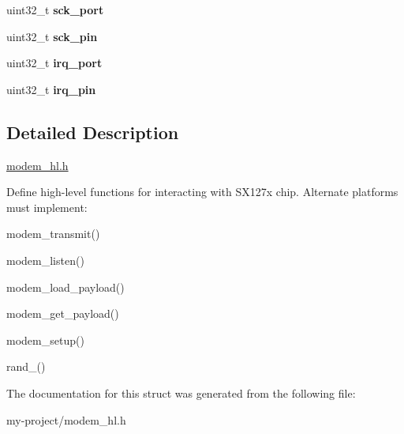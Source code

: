 \begin{DoxyCompactItemize}
\item 
\mbox{\label{structmodem__hw_af51228af0471ebc52ada791eefaf8a4e}} 
uint32\+\_\+t {\bfseries sck\+\_\+port}
\item 
\mbox{\label{structmodem__hw_a6eaf93249fa53f578bfc24f7c8cd7f26}} 
uint32\+\_\+t {\bfseries sck\+\_\+pin}
\item 
\mbox{\label{structmodem__hw_aed7efb541ab594cfdc974e2b73d76ad7}} 
uint32\+\_\+t {\bfseries irq\+\_\+port}
\item 
\mbox{\label{structmodem__hw_a55583ff559e579c242e0d1433fd9c7fa}} 
uint32\+\_\+t {\bfseries irq\+\_\+pin}
\end{DoxyCompactItemize}


\subsection{Detailed Description}
\mbox{\hyperlink{modem__hl_8h_source}{modem\+\_\+hl.\+h}}

Define high-\/level functions for interacting with S\+X127x chip. Alternate platforms must implement\+:
\begin{DoxyItemize}
\item modem\+\_\+transmit()
\item modem\+\_\+listen()
\item modem\+\_\+load\+\_\+payload()
\item modem\+\_\+get\+\_\+payload()
\item modem\+\_\+setup()
\item rand\+\_() 
\end{DoxyItemize}

The documentation for this struct was generated from the following file\+:\begin{DoxyCompactItemize}
\item 
my-\/project/modem\+\_\+hl.\+h\end{DoxyCompactItemize}
